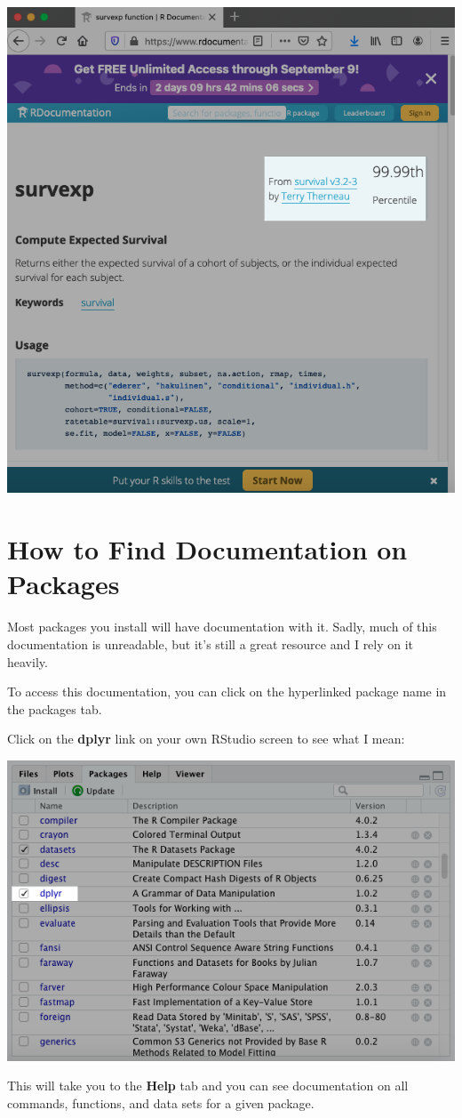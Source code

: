 \documentclass[
]{book}
\begin{document}
\begin{center}
\begin{center}\includegraphics[width=0.6\linewidth]{1.43_Package_Info} \end{center}

\hypertarget{how-to-find-documentation-on-packages}{%
\section{How to Find Documentation on Packages}\label{how-to-find-documentation-on-packages}}

Most packages you install will have documentation with it. Sadly, much of this documentation is unreadable, but it's still a great resource and I rely on it heavily.

To access this documentation, you can click on the hyperlinked package name in the packages tab.

Click on the \textbf{dplyr} link on your own RStudio screen to see what I mean:

\begin{center}\includegraphics[width=0.6\linewidth]{1.41_Dplyr_Loaded} \end{center}

This will take you to the \textbf{Help} tab and you can see documentation on all commands, functions, and data sets for a given package.


\end{center}
\end{document}
